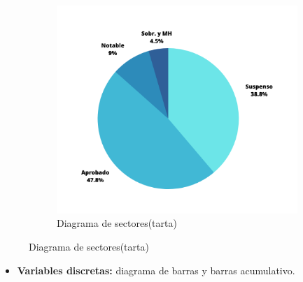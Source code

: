 \begin{figure}[h]
\begin{subfigure}{0.5\textwidth}
		\includegraphics[width=1\linewidth]{"Temas/Imagenes/Tema 1/Diagrama de sectores"}
		\caption*{Diagrama de sectores(tarta)}
	\end{subfigure}
\end{figure}
\newpage
\begin{itemize}
	\item \textbf{Variables discretas:} diagrama de barras y barras acumulativo.
\end{itemize}
